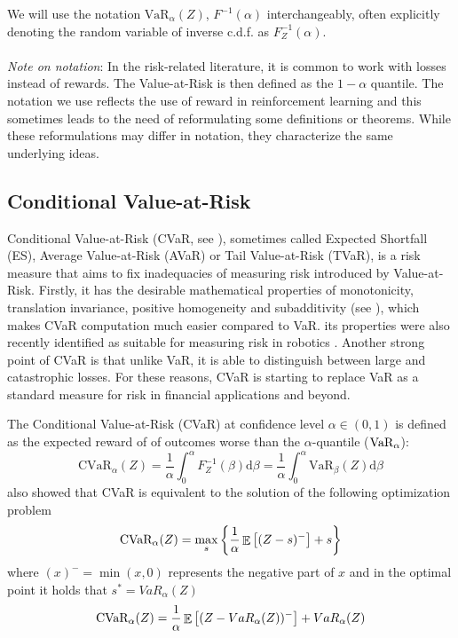 We will use the notation $\text{VaR}_\alpha(Z)$, $F^{-1}(\alpha)$ interchangeably, often explicitly denoting the random variable of inverse c.d.f. as $F^{-1}_Z(\alpha)$.
\\
\\
\textit{Note on notation}: In the risk-related literature, it is common to work with losses instead of rewards. The Value-at-Risk is then defined as the $1-\alpha$ quantile. The notation we use reflects the use of reward in reinforcement learning and this sometimes leads to the need of reformulating some definitions or theorems. While these reformulations may differ in notation, they characterize the same underlying ideas.

\subsection{Conditional Value-at-Risk}

Conditional Value-at-Risk (CVaR, see \citet{rockafellar2000optimization,rockafellar2002conditional}), sometimes called Expected Shortfall (ES), Average Value-at-Risk (AVaR) or Tail Value-at-Risk (TVaR), is a risk measure that aims to fix inadequacies of measuring risk introduced by Value-at-Risk. Firstly, it has the desirable mathematical properties of monotonicity, translation invariance, positive homogeneity and subadditivity (see \citet{artzner1999coherent}), which makes CVaR computation much easier compared to VaR. its properties were also recently identified as suitable for measuring risk in robotics \cite{majumdar2017should}. Another strong point of CVaR is that unlike VaR, it is able to distinguish between large and catastrophic losses. For these reasons, CVaR is starting to replace VaR as a standard measure for risk in financial applications \citep{basel2013fundamental} and beyond.

The Conditional Value-at-Risk (CVaR) at confidence level $\alpha \in (0,1)$ is defined as the expected reward of of outcomes worse than the $\alpha$-quantile ($\text{VaR}_\alpha$):
\begin{equation}\label{eqn:cvardef}
\text{CVaR}_\alpha(Z) = \dfrac{1}{\alpha}\int_0^\alpha F^{-1}_Z(\beta) \text{d}\beta = \dfrac{1}{\alpha}\int_0^\alpha \text{VaR}_\beta(Z) \text{d}\beta
\end{equation}
\citet{rockafellar2000optimization} also showed that CVaR is equivalent to the solution of the following optimization problem
\begin{equation}\label{eqn:cvarprimal}
\text{CVaR}_\alpha(Z)=
\max_s\left\lbrace \dfrac{1}{\alpha}\mathop{\mathbb{E}}
\left[ (Z-s)^-\right] + s  \right\rbrace 
\end{equation}
where $(x)^- = \min(x, 0)$ represents the negative part of $x$ and in the optimal point it holds that $s^* = VaR_\alpha(Z)$
\begin{equation}
\text{CVaR}_\alpha(Z)= \dfrac{1}{\alpha}\mathop{\mathbb{E}} \left[ (Z-VaR_\alpha(Z))^-\right] + VaR_\alpha(Z)
\end{equation}

